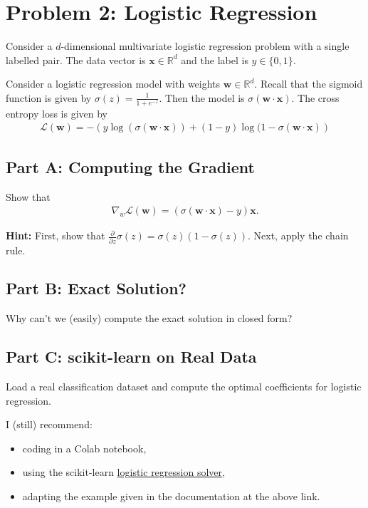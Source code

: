 \documentclass{article}
\begin{document}
%

\newpage
\section*{Problem 2: Logistic Regression}

Consider a $d$-dimensional multivariate logistic regression problem with a single labelled pair.
The data vector is $\mathbf{x} \in \mathbb{R}^d$ and the label is $y \in \{0,1\}$.

Consider a logistic regression model with weights $\mathbf{w} \in \mathbb{R}^d$.
Recall that the sigmoid function is given by $\sigma(z) = \frac1{1+e^{-z}}.$
Then the model is $\sigma(\mathbf{w} \cdot \mathbf{x})$.
The cross entropy loss is given by
\begin{align}
    \mathcal{L}(\mathbf{w})
    = -  \left(y \log(\sigma(\mathbf{w} \cdot \mathbf{x})) + 
    (1-y) \log(1-\sigma(\mathbf{w} \cdot \mathbf{x})\right)
\end{align}

\subsection*{Part A: Computing the Gradient}

Show that 
\begin{align}
    \nabla_w\mathcal{L}(\mathbf{w}) = (\sigma(\mathbf{w} \cdot \mathbf{x})-y)\mathbf{x}.
\end{align}

\textbf{Hint:} First, show that $\frac{\partial}{\partial z} \sigma(z) = \sigma(z) (1- \sigma(z))$. Next, apply the chain rule.

\subsection*{Part B: Exact Solution?}

Why can't we (easily) compute the exact solution in closed form?

\subsection*{Part C: scikit-learn on Real Data}

Load a real classification dataset and compute the optimal coefficients for logistic regression.

I (still) recommend:
\begin{itemize}
    \item coding in a Colab notebook,
    \item using the scikit-learn \href{https://scikit-learn.org/stable/modules/generated/sklearn.linear_model.LogisticRegression.html}{logistic regression solver},
    \item adapting the example given in the documentation at the above link.
\end{itemize}

%
\end{document}

